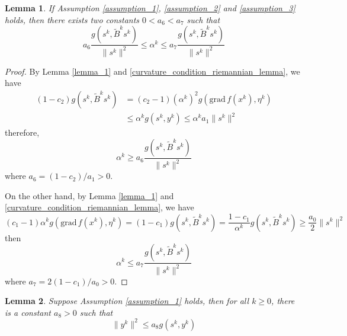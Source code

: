 \documentclass[12pt,a4paper,draft]{article}  %
\newtheorem{lemma}{Lemma}[section]
\theoremstyle{definition}
\numberwithin{equation}{section}
\newcommand{\grad}{\mathrm{grad}\,}
\begin{document}
\begin{lemma}\label{lemma_6}
        If Assumption \ref{assumption_1}, \ref{assumption_2} and \ref{assumption_3} holds, then there exists two constants $0<a_6<a_7$ such that
        \begin{equation}
        a_6\frac{g(s^k,\tilde{B}^ks^k)}{\|s^k\|^2}\leq\alpha^k \leq a_7\frac{g(s^k,\tilde{B}^ks^k)}{\|s^k\|^2}
        \end{equation}
\end{lemma}
\begin{proof}
        By Lemma \ref{lemma_1} and \ref{curvature_condition_riemannian_lemma}, we have
        \[
        \begin{aligned}
                (1-c_2)g\left(s^k,\tilde{B}^ks^k\right) &= (c_2 - 1)(\alpha^k)^2 g\left(\grad f(x^k), \eta^k\right)\\
                &\leq \alpha^k g(s^k,y^k) \leq \alpha^ka_1\|s^k\|^2
        \end{aligned}
        \]
        therefore,
        \[
        \alpha^k \geq a_6\frac{g(s^k,\tilde{B}^ks^k)}{\|s^k\|^2}
        \]
        where $a_6 = (1-c_2)/a_1 > 0$. 
        
        On the other hand, by Lemma \ref{lemma_1} and \ref{curvature_condition_riemannian_lemma}, we have
        \[
        (c_1-1)\alpha^k g\left(\grad f(x^k), \eta^k\right) = (1-c_1)g\left(s^k,\tilde{B}^ks^k\right) = \frac{1-c_1}{\alpha^k}g\left(s^k,\tilde{B}^ks^k\right) \geq \frac{a_0}{2}\|s^k\|^2
        \]
        then
        \[
        \alpha^k \leq a_7\frac{g(s^k,\tilde{B}^ks^k)}{\|s^k\|^2}
        \]
        where $a_7 = 2(1-c_1)/a_0 > 0$.
\end{proof}
\begin{lemma}
        Suppose Assumption \ref{assumption_1} holds, then for all $k\geq 0$, there is a constant $a_8>0$ such that
        \begin{equation}
                \|y^k\|^2\leq a_8 g(s^k,y^k)
        \end{equation}
\end{lemma}
\end{document}
